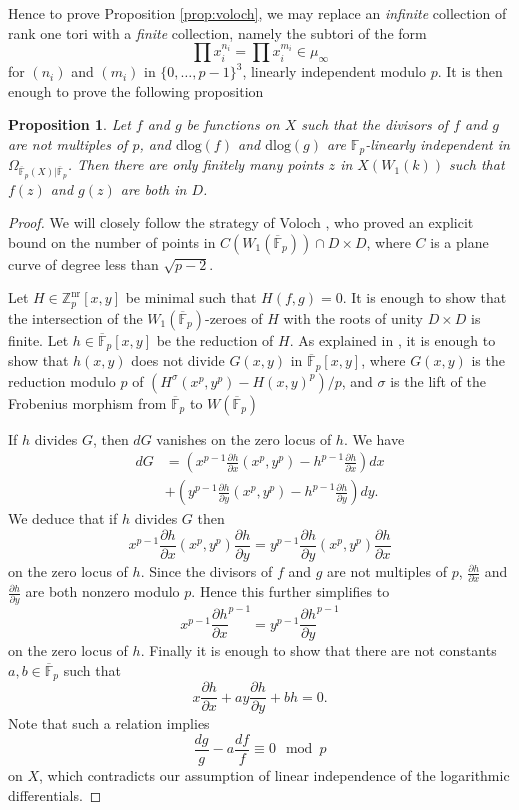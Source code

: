 \documentclass{amsart}
\def\Z{\mathbb Z}
\newtheorem{proposition}{Proposition}
\theoremstyle{definition}
\newcommand{\F}{\mathbb{F}}
\newcommand{\dlog}{\mathrm{dlog}}
\begin{document}
Hence to prove Proposition \ref{prop:voloch}, we may replace an \textit{infinite} collection of rank one tori with a \textit{finite} collection, namely the subtori of the form
\[
\prod x_i ^{n_i }=\prod x_i ^{m_i }\in \mu _{\infty }
\]
for $(n_i )$ and $(m_i )$ in $\{ 0,\ldots ,p-1 \}^3 $, linearly independent modulo $p$. It is then enough to prove the following proposition

\begin{proposition}\label{prop:voloch2}
Let $f$ and $g$ be functions on $X$ such that the divisors of $f$ and $g$ are not multiples of $p$, and $\dlog (f)$ and $\dlog (g)$ are $\F _p $-linearly independent in $\Omega _{\overline{\F }_p (X)|\overline{\F }_p }$. Then there are only finitely many points $z$ in $X(W_1 (k))$ such that $f(z)$ and $g(z)$ are both in $D$.
\end{proposition}
\begin{proof}
We will closely follow the strategy of Voloch \cite{voloch}, who proved an explicit bound on the number of points in $C(W_1 (\overline{\F }_p ))\cap D\times D$, where $C$ is a plane curve of degree less than $\sqrt{p-2}$.

Let $H\in \Z_p ^{\mathrm{nr}} [x,y]$ be minimal such that $H(f,g)=0$. It is enough to show that the intersection of the $W_1 (\overline{\F }_p )$-zeroes of $H$ with the roots of unity $D\times D$ is finite. Let $h\in \overline{\F }_p [x,y]$ be the reduction of $H$. As explained in \cite{voloch}, it is enough to show that $h(x,y)$ does not divide $G(x,y)$ in $\overline{\F }_p [x,y]$, where $G(x,y)$ is the reduction modulo $p$ of $(H^{\sigma }(x^p,y^p)-H(x,y)^p)/p$, and $\sigma $ is the lift of the Frobenius morphism from $\overline{\F }_p $ to $W(\overline{\F }_p )$

If $h$ divides $G$, then $dG$ vanishes on the zero locus of $h$. We have
\begin{align*}
dG & =(x^{p-1} \frac{\partial h}{\partial x}(x^p ,y^p )-h^{p-1}\frac{\partial h}{\partial x})dx \\
& +(y^{p-1} \frac{\partial h}{\partial y}(x^p ,y^p )-h^{p-1}\frac{\partial h}{\partial y})dy. 
\end{align*} 
We deduce that if $h$ divides $G$ then
\[
x^{p-1} \frac{\partial h}{\partial x}(x^p ,y^p )\frac{\partial h}{\partial y}=y^{p-1} \frac{\partial h}{\partial y}(x^p ,y^p )\frac{\partial h}{\partial x}
\]
on the zero locus of $h$.
Since the divisors of $f$ and $g$ are not multiples of $p$, $\frac{\partial h}{\partial x}$ and $\frac{\partial h}{\partial y}$ are both nonzero modulo $p$. Hence this further simplifies to
\[
x^{p-1} \frac{\partial h}{\partial x}^{p-1}=y^{p-1} \frac{\partial h}{\partial y}^{p-1}
\]
on the zero locus of $h$. Finally it is enough to show that there are not constants $a,b\in \overline{\F }_p$ such that
\[
x\frac{\partial h}{\partial x}+ay\frac{\partial h}{\partial y}+bh=0.
\]
Note that such a relation implies 
\[
\frac{dg}{g}-a\frac{df}{f}\equiv 0 \mod p
\]
on $X$, which contradicts our assumption of linear independence of the logarithmic differentials.
\end{proof}
\end{document}
